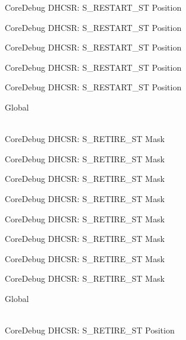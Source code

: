 \begin{DoxyRefList}
\label{deprecated__deprecated000246}%
%
Core\+Debug DHCSR\+: S\+\_\+\+RESTART\+\_\+\+ST Position 

\label{deprecated__deprecated000303}%
%
Core\+Debug DHCSR\+: S\+\_\+\+RESTART\+\_\+\+ST Position 

\label{deprecated__deprecated000379}%
%
Core\+Debug DHCSR\+: S\+\_\+\+RESTART\+\_\+\+ST Position 

\label{deprecated__deprecated000458}%
%
Core\+Debug DHCSR\+: S\+\_\+\+RESTART\+\_\+\+ST Position 

\label{deprecated__deprecated000560}%
%
Core\+Debug DHCSR\+: S\+\_\+\+RESTART\+\_\+\+ST Position  
\item[{\parbox[t]{\linewidth}{Global \doxylink{group___c_m_s_i_s___core_debug_ga89dceb5325f6bcb36a0473d65fbfcfa6}{Core\+Debug\+\_\+\+DHCSR\+\_\+\+S\+\_\+\+RETIRE\+\_\+\+ST\+\_\+\+Msk} }}]\hfill \\
\label{deprecated__deprecated000012}%
%
Core\+Debug DHCSR\+: S\+\_\+\+RETIRE\+\_\+\+ST Mask 

\label{deprecated__deprecated000112}%
%
Core\+Debug DHCSR\+: S\+\_\+\+RETIRE\+\_\+\+ST Mask 

\label{deprecated__deprecated000166}%
%
Core\+Debug DHCSR\+: S\+\_\+\+RETIRE\+\_\+\+ST Mask 

\label{deprecated__deprecated000251}%
%
Core\+Debug DHCSR\+: S\+\_\+\+RETIRE\+\_\+\+ST Mask 

\label{deprecated__deprecated000308}%
%
Core\+Debug DHCSR\+: S\+\_\+\+RETIRE\+\_\+\+ST Mask 

\label{deprecated__deprecated000384}%
%
Core\+Debug DHCSR\+: S\+\_\+\+RETIRE\+\_\+\+ST Mask 

\label{deprecated__deprecated000463}%
%
Core\+Debug DHCSR\+: S\+\_\+\+RETIRE\+\_\+\+ST Mask 

\label{deprecated__deprecated000565}%
%
Core\+Debug DHCSR\+: S\+\_\+\+RETIRE\+\_\+\+ST Mask  
\item[{\parbox[t]{\linewidth}{Global \doxylink{group___c_m_s_i_s___core_debug_ga2328118f8b3574c871a53605eb17e730}{Core\+Debug\+\_\+\+DHCSR\+\_\+\+S\+\_\+\+RETIRE\+\_\+\+ST\+\_\+\+Pos} }}]\hfill \\
\label{deprecated__deprecated000011}%
%
Core\+Debug DHCSR\+: S\+\_\+\+RETIRE\+\_\+\+ST Position 


\end{DoxyRefList}
